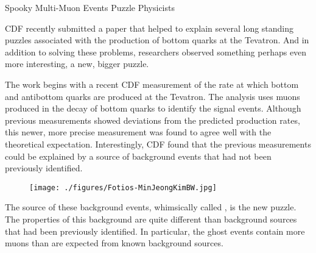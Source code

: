 \begin{MyArticle}[enhanced, tikz={rotate=0},
  borderline={1mm}{0mm}{dotted}, width=1.0\textwidth]{Spooky Multi-Muon Events Puzzle Physicists}
  \begin{multicols}{2}
    CDF recently submitted a paper that helped to explain several long
    standing puzzles associated with the production of bottom quarks
    at the Tevatron. And in addition to solving these problems,
    researchers observed something perhaps even more interesting, a
    new, bigger puzzle.

    The work begins with a recent CDF measurement of the rate at which
    bottom and antibottom quarks are produced at the Tevatron. The
    analysis uses muons produced in the decay of bottom quarks to identify
    the signal events. Although previous measurements showed deviations
    from the predicted production rates, this newer, more precise
    measurement was found to agree well with the theoretical
    expectation. Interestingly, CDF found that the previous measurements
    could be explained by a source of background events that had not been
    previously identified. %

    \begin{figure}
      \begin{center}
      \leavevmode
      \texttt{[image: ./figures/Fotios-MinJeongKimBW.jpg]}
      \end{center}
    \end{figure}
    
    The source of these background events, whimsically called , is the new puzzle. The properties of this background are
    quite different than background sources that had been previously
    identified. In particular, the ghost events contain more muons than
    are expected from known background sources.


\end{multicols}
\end{MyArticle}
